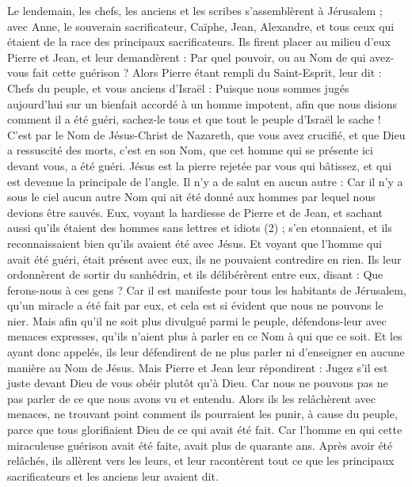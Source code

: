 \begin{multicols}{2}
Le lendemain, les chefs, les anciens et les scribes s'assemblèrent à Jérusalem ;
avec Anne, le souverain sacrificateur, Caïphe, Jean, Alexandre, et tous ceux qui étaient de la race des principaux sacrificateurs.
Ils firent placer au milieu d’eux Pierre et Jean, et leur demandèrent : Par quel pouvoir, ou au Nom de qui avez-vous fait cette guérison ?
Alors Pierre étant rempli du Saint-Esprit, leur dit : Chefs du peuple, et vous anciens d'Israël :
Puisque nous sommes jugés aujourd'hui sur un bienfait accordé à un homme impotent, afin que nous disions comment il a été guéri,
sachez-le tous et que tout le peuple d'Israël le sache ! C’est par le Nom de Jésus-Christ de Nazareth, que vous avez crucifié, et que Dieu a ressuscité des morts, c’est en son Nom, que cet homme qui se présente ici devant vous, a été guéri.
Jésus est la pierre rejetée par vous qui bâtissez, et qui est devenue la principale de l’angle.
Il n'y a de salut en aucun autre : Car il n'y a sous le ciel aucun autre Nom qui ait été donné aux hommes par lequel nous devions être sauvés.
Eux, voyant la hardiesse de Pierre et de Jean, et sachant aussi qu'ils étaient des hommes sans lettres et idiots (2) ; s'en etonnaient, et ils reconnaissaient bien qu'ils avaient été avec Jésus.
Et voyant que l'homme qui avait été guéri, était présent avec eux, ils ne pouvaient contredire en rien.
Ils leur ordonnèrent de sortir du sanhédrin, et ils délibérèrent entre eux, disant : Que ferons-nous à ces gens ?
Car il est manifeste pour tous les habitants de Jérusalem, qu'un miracle a été fait par eux, et cela est si évident que nous ne pouvons le nier.
Mais afin qu'il ne soit plus divulgué parmi le peuple, défendons-leur avec menaces expresses, qu'ils n'aient plus à parler en ce Nom à qui que ce soit.
Et les ayant donc appelés, ils leur défendirent de ne plus parler ni d’enseigner en aucune manière au Nom de Jésus.
Mais Pierre et Jean leur répondirent : Jugez s'il est juste devant Dieu de vous obéir plutôt qu'à Dieu.
Car nous ne pouvons pas ne pas parler de ce que nous avons vu et entendu.
Alors ils les relâchèrent avec menaces, ne trouvant point comment ils pourraient les punir, à cause du peuple, parce que tous glorifiaient Dieu de ce qui avait été fait.
Car l'homme en qui cette miraculeuse guérison avait été faite, avait plus de quarante ans.
Après avoir été relâchés, ils allèrent vers les leurs, et leur racontèrent tout ce que les principaux sacrificateurs et les anciens leur avaient dit.

\end{multicols}
